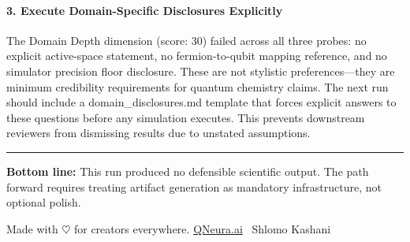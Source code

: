 \documentclass[10pt,letterpaper]{article}
\begin{document}
\hypertarget{execute-domain-specific-disclosures-explicitly}{%
\paragraph{3. Execute Domain-Specific Disclosures Explicitly}\label{execute-domain-specific-disclosures-explicitly}}

The Domain Depth dimension (score: 30) failed across all three probes: no explicit active-space statement, no fermion-to-qubit mapping reference, and no simulator precision floor disclosure. These are not stylistic preferences---they are minimum credibility requirements for quantum chemistry claims. The next run should include a domain\_disclosures.md template that forces explicit answers to these questions before any simulation executes. This prevents downstream reviewers from dismissing results due to unstated assumptions.

\begin{center}\rule{0.5\linewidth}{0.5pt}\end{center}

\textbf{Bottom line:} This run produced no defensible scientific output. The path forward requires treating artifact generation as mandatory infrastructure, not optional polish.


\vfill
\begin{center}\small\textcolor{muted}{Made with $\heartsuit$ for creators everywhere. \href{https://qneura.ai/apps.html}{QNeura.ai} \textperiodcentered\ Shlomo Kashani}\end{center}
\end{document}
